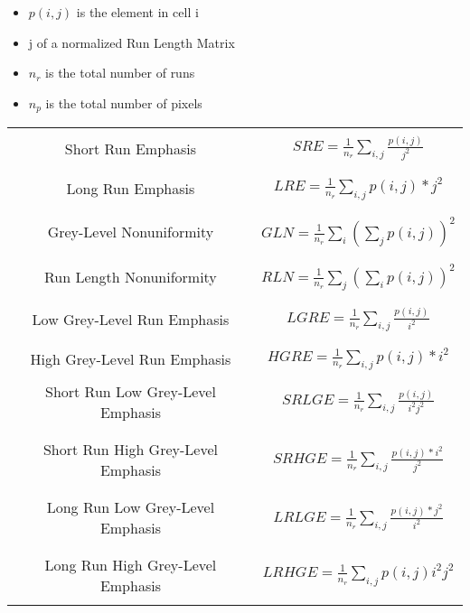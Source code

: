 \begin{itemize}
\item $p(i, j)$ is the element in cell i
\item j of a normalized Run Length Matrix
\item $n_r$ is the total number of runs
\item $n_p$ is the total number of pixels
\end{itemize}

\begin{table}
\begin{center}
\begin{tabular}[h!]{|c|c|}
\hline
& \\
Short Run Emphasis & $ SRE = \frac{1}{n_r} \sum_{i, j}\frac{p(i, j)}{j^2} $ \\
& \\
\hline
& \\
Long Run Emphasis & $ LRE =  \frac{1}{n_r} \sum_{i, j}p(i, j) * j^2 $ \\
& \\
\hline
& \\
Grey-Level Nonuniformity & $ GLN = \frac{1}{n_r} \sum_{i} \left( \sum_{j}{p(i, j)} \right)^2 $ \\
& \\
\hline
& \\
Run Length Nonuniformity &  $ RLN = \frac{1}{n_r} \sum_{j} \left( \sum_{i}{p(i, j)} \right)^2 $ \\
& \\
\hline
& \\
Low Grey-Level Run Emphasis & $ LGRE = \frac{1}{n_r} \sum_{i, j}\frac{p(i, j)}{i^2} $ \\
& \\
\hline
& \\
High Grey-Level Run Emphasis & $ HGRE = \frac{1}{n_r} \sum_{i, j}p(i, j) * i^2 $ \\
& \\
\hline
Short Run Low Grey-Level Emphasis & $ SRLGE = \frac{1}{n_r} \sum_{i, j}\frac{p(i, j)}{i^2 j^2} $ \\
& \\
\hline
& \\
Short Run High Grey-Level Emphasis & $ SRHGE = \frac{1}{n_r} \sum_{i, j}\frac{p(i, j) * i^2}{j^2} $ \\
& \\
\hline
& \\
Long Run Low Grey-Level Emphasis & $ LRLGE = \frac{1}{n_r} \sum_{i, j}\frac{p(i, j) * j^2}{i^2} $ \\
& \\
\hline
& \\
Long Run High Grey-Level Emphasis & $ LRHGE = \frac{1}{n_r} \sum_{i, j} p(i, j) i^2 j^2 $ \\
& \\
\hline
\end{tabular}
\end{center}
\label{tab:haralickHigherOrderFeatures}
\end{table}

